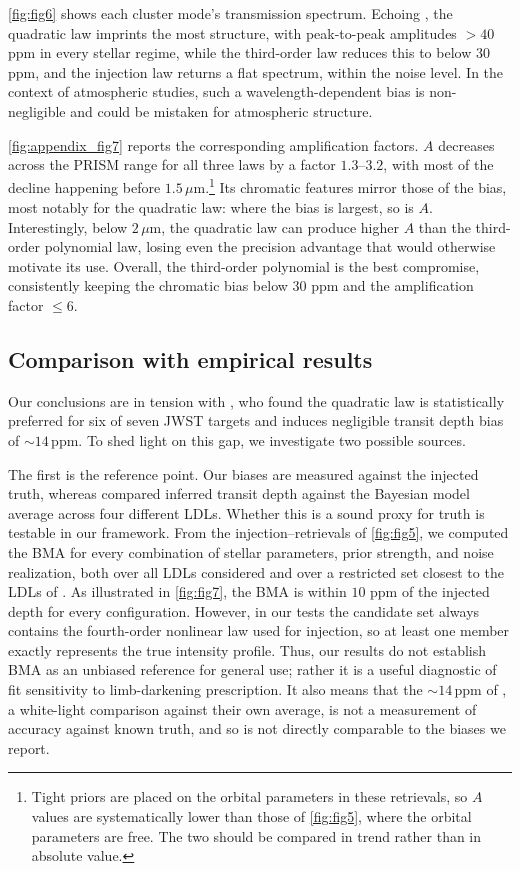 \documentclass[twocolumn]{aastex631}
\newcommand{\vtwo}[1]{{#1}}
\begin{document}
\vtwo{\autoref{fig:fig6} shows each cluster mode's transmission spectrum. Echoing \cite{Keers2024}, the quadratic law imprints the most structure, with peak-to-peak amplitudes $>40$ ppm in every stellar regime, while the third-order law reduces this to below $30$ ppm, and the injection law returns a flat spectrum, within the noise level. In the context of atmospheric studies, such a wavelength-dependent bias is non-negligible and could be mistaken for atmospheric structure.}

\vtwo{\autoref{fig:appendix_fig7} reports the corresponding amplification factors. $A$ decreases across the PRISM range for all three laws by a factor $1.3$--$3.2$, with most of the decline happening before $1.5\,\mu$m.\footnote{Tight priors are placed on the orbital parameters in these retrievals, so $A$ values are systematically lower than those of \autoref{fig:fig5}, where the orbital parameters are free. The two should be compared in trend rather than in absolute value.} Its chromatic features mirror those of the bias, most notably for the quadratic law: where the bias is largest, so is $A$. Interestingly, below $2\,\mu$m, the quadratic law can produce higher $A$ than the third-order polynomial law, losing even the precision advantage that would otherwise motivate its use. Overall, the third-order polynomial is the best compromise, consistently keeping the chromatic bias below $30$ ppm and the amplification factor $\leq 6$.}

\subsection{\vtwo{Comparison with empirical results}}\label{sec:compare_empirics}
\vtwo{
Our conclusions are in tension with , who found the quadratic law is statistically preferred for six of seven JWST targets and induces negligible transit depth bias of $\sim14$\,ppm. To shed light on this gap, we investigate two possible sources.}

\vtwo{The first is the reference point. Our biases are measured against the injected truth, whereas \citetalias{Sing2026} compared inferred transit depth against the Bayesian model average across four different LDLs. Whether this is a sound proxy for truth is testable in our framework. From the injection--retrievals of \autoref{fig:fig5}, we computed the BMA for every combination of stellar parameters, prior strength, and noise realization, both over all LDLs considered and over a restricted set closest to the LDLs of \citetalias{Sing2026}. As illustrated in \autoref{fig:fig7}, the BMA is within $10$ ppm of the injected depth for every configuration. However, in our tests the candidate set always contains the fourth-order nonlinear law used for injection, so at least one member exactly represents the true intensity profile. Thus, our results do not establish BMA as an unbiased reference for general use; rather it is a useful diagnostic of fit sensitivity to limb-darkening prescription. It also means that the ${\sim}14$\,ppm of \citetalias{Sing2026}, a white-light comparison against their own average, is not a measurement of accuracy against known truth, and so is not directly comparable to the biases we report.}
\end{document}
